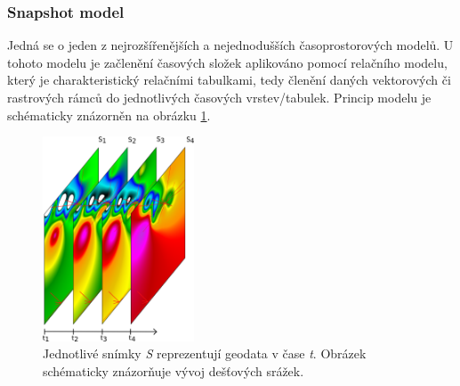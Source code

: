 \documentclass[a4paper,12pt]{report}
\begin{document}
\subsubsection*{Snapshot model}
Jedná se o jeden z nejrozšířenějších a nejednodušších časoprostorových modelů. U tohoto modelu je začlenění časových složek aplikováno pomocí relačního modelu, který je charakteristický relačními tabulkami, tedy členění daných vektorových či rastrových rámců do jednotlivých časových vrstev/tabulek. Princip modelu je schématicky znázorněn na obrázku \ref{fig:snapshot}.

\begin{figure}[h!]
    \centering
    \includegraphics[width=0.4\textwidth]{./img/temporal/snapshot.png}
    \caption[Snapshot model]{Jednotlivé snímky \emph{S} reprezentují  geodata v čase \emph{t}. Obrázek schématicky znázorňuje vývoj dešťových srážek.  \centering \footnotemark }
        \label{fig:snapshot}
 \end{figure}   
\end{document}
